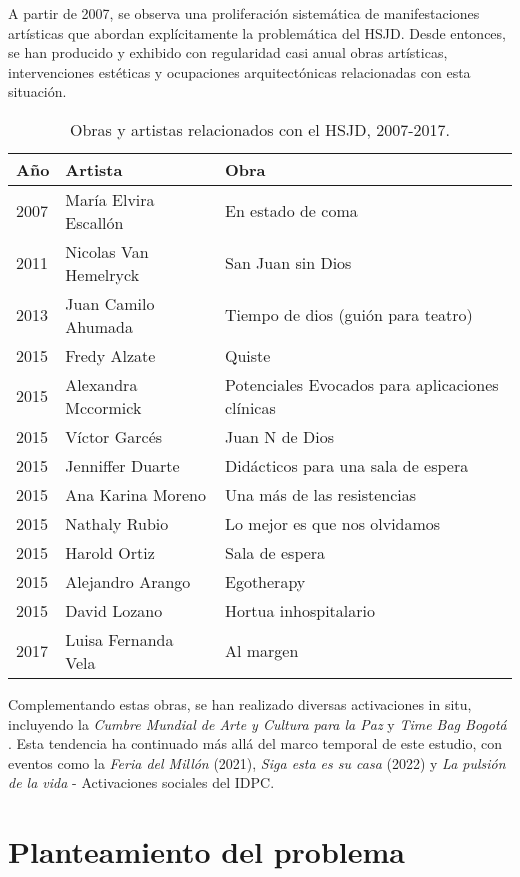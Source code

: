 A partir de 2007, se observa una proliferación sistemática de manifestaciones artísticas que abordan explícitamente la problemática del HSJD. Desde entonces, se han producido y exhibido con regularidad casi anual obras artísticas, intervenciones estéticas y ocupaciones arquitectónicas relacionadas con esta situación.

\begin{table}[h!]
\centering
\begin{tabular}{|l|l|l|}
\hline
\textbf{Año} & \textbf{Artista} & \textbf{Obra} \\ \hline
2007 & María Elvira Escallón & En estado de coma \\ \hline
2011 & Nicolas Van Hemelryck & San Juan sin Dios \\ \hline
2013 & Juan Camilo Ahumada & Tiempo de dios (guión para teatro) \\ \hline
2015 & Fredy Alzate & Quiste \\ \hline
2015 & Alexandra Mccormick & Potenciales Evocados para aplicaciones clínicas \\ \hline
2015 & Víctor Garcés & Juan N de Dios \\ \hline
2015 & Jenniffer Duarte & Didácticos para una sala de espera \\ \hline
2015 & Ana Karina Moreno & Una más de las resistencias \\ \hline
2015 & Nathaly Rubio & Lo mejor es que nos olvidamos \\ \hline
2015 & Harold Ortiz & Sala de espera \\ \hline
2015 & Alejandro Arango & Egotherapy \\ \hline
2015 & David Lozano & Hortua inhospitalario \\ \hline
2017 & Luisa Fernanda Vela & Al margen \\ \hline
\end{tabular}
\caption{Obras y artistas relacionados con el HSJD, 2007-2017.}
\label{tabla:obras_artistas}
\end{table}

Complementando estas obras, se han realizado diversas activaciones in situ, incluyendo la \textit{Cumbre Mundial de Arte y Cultura para la Paz} y \textit{Time Bag Bogotá} \parencite{IDARTES2015}. Esta tendencia ha continuado más allá del marco temporal de este estudio, con eventos como la \textit{Feria del Millón} (2021), \textit{Siga esta es su casa} (2022) y \textit{La pulsión de la vida} - Activaciones sociales del IDPC.

\section*{Planteamiento del problema}

